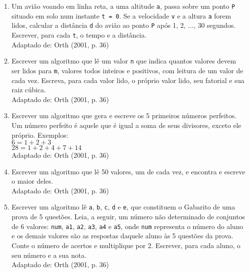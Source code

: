 \documentclass[onecolumn,a4paper,10pt]{report}
\newcommand{\+}{\, + \,}
\newcommand{\<}{\hspace*{-0.4cm}}
\begin{document}
\begin{enumerate}[1.]
\item Um avião voando em linha reta, a uma altitude \texttt{a}, passa sobre um ponto \texttt{P} situado em solo num instante \texttt{t = 0}. Se a velocidade \texttt{v} e a altura \texttt{a} forem lidos, calcular a distância \texttt{d} do avião ao ponto \texttt{P} após 1, 2, ..., 30
segundos. Escrever, para cada \texttt{t}, o tempo e a distância.\\
{\tiny Adaptado de: Orth (2001, p. 36)}

\item Escrever um algoritmo que lê um valor \texttt{n} que indica quantos valores devem ser lidos para \texttt{m}, valores todos inteiros e positivos, com leitura de um valor de cada vez. Escreva, para cada valor lido, o próprio valor lido, seu fatorial e sua raiz cúbica.\\
{\tiny Adaptado de: Orth (2001, p. 36)}

\item Escrever um algoritmo que gera e escreve os 5 primeiros números perfeitos. Um número perfeito é aquele que é igual a soma de seus divisores, exceto ele próprio. Exemplos:\\
$6 = 1 + 2 + 3$\\
$28 = 1 + 2 + 4 + 7 + 14$\\
{\tiny Adaptado de: Orth (2001, p. 36)}

\item Escrever um algoritmo que lê 50 valores, um de cada vez, e encontra e escreve o maior deles.\\
{\tiny Adaptado de: Orth (2001, p. 36)}

\item Escrever um algoritmo lê \texttt{a}, \texttt{b}, \texttt{c}, \texttt{d} e \texttt{e}, que constituem o Gabarito de uma prova de 5 questões. Leia, a seguir, um número não determinado de conjuntos de 6 valores: \texttt{num}, \texttt{a1}, \texttt{a2}, \texttt{a3}, \texttt{a4} e \texttt{a5}, onde \texttt{num} representa o número do aluno e os demais valores são as respostas daquele aluno às 5 questões da prova. Conte o número de acertos e multiplique por 2. Escrever, para cada aluno, o seu número e a sua nota.\\
{\tiny Adaptado de: Orth (2001, p. 36)}


\end{enumerate}
\end{document}
